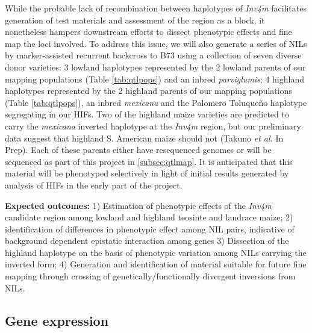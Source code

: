While the probable lack of recombination between haplotypes of \emph{Inv4m} \citep{Pyhajarvi2013} facilitates generation of test materials and assessment of the region as a block, it nonetheless hampers downstream efforts to dissect phenotypic effects and fine map the loci involved. To address this issue, we will also generate a series of NILs by marker-assisted recurrent backcross to B73 using a collection of seven diverse donor varieties: 3 lowland haplotypes represented by the 2 lowland parents of our mapping populations (Table \ref{tab:qtlpops}) and an inbred \emph{parviglumis}; 4 highland haplotypes represented by the 2 highland parents of our mapping populations (Table \ref{tab:qtlpops}), an inbred \emph{mexicana} and the Palomero Toluque\~no haplotype segregating in our HIFs. Two of the highland maize varieties are predicted to carry the \emph{mexicana} inverted haplotype at the \emph{Inv4m} region, but our preliminary data suggest that highland S. American maize should not (Takuno \emph{et al.} In Prep).  Each of these parents either have resequenced genomes \citep{Vielle-Calzada2009, Chia2012a} or will be sequenced as part of this project in \ref{subsec:qtlmap}. It is anticipated that this material will be phenotyped selectively in light of initial results generated by analysis of HIFs in the early part of the project.

{\bf Expected outcomes:} 1) Estimation of phenotypic effects of the \emph{Inv4m} candidate region among lowland and highland teosinte and landrace maize; 2) identification of differences in phenotypic effect among NIL pairs, indicative of background dependent epistatic interaction among genes 3) Dissection of the highland haplotype on the basis of phenotypic variation among NILs carrying the inverted form; 4) Generation and identification of material suitable for future fine mapping through crossing of genetically/functionally divergent inversions from NILs.   

\subsection{Gene expression} \label{subsec:rnaseq}

